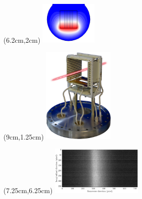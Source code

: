 \begin{frame}[t]
    \begin{textblock*}{2.8cm}(6.2cm,2cm)      
      \includegraphics[width=2.8cm]{03_SIM/fig/fig000_Lines_Corr.png}
    \end{textblock*}
    \begin{textblock*}{4cm}(9cm,1.25cm)      
      \includegraphics[width=3.5cm]{04_Test/fig/fig000_IPM_photo2}
    \end{textblock*}
    \begin{textblock*}{4.5cm}(7.25cm,6.25cm)      
      \includegraphics[width=4.5cm]{04_Test/fig/fig000_image_beam}
    \end{textblock*}
\end{frame}

